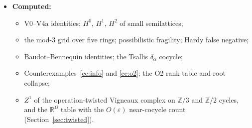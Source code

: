 \documentclass[11pt]{article}
\theoremstyle{definition}
\theoremstyle{remark}
\newcommand{\Z}{\mathbb{Z}}
\newcommand{\R}{\mathbb{R}}
\begin{document}
\begin{itemize}
\begin{itemize}
    \item the band proposition (Proposition~\ref{prop:band}) and twist-invariance for symmetric local solutions (Proposition~\ref{prop:twistinv}); holonomy on the graph stratum with $\R^\Omega$ coefficients (Proposition~\ref{prop:pwgraph}), non-exact under Vigneaux locality; weak-edge contextuality without holonomy (Proposition~\ref{prop:weakedge}); the admissibility criterion (Corollary~\ref{cor:admiss}); two-sided acyclicity (Proposition~\ref{prop:twoside}); single-source consistency (Proposition~\ref{prop:singlesource}); formality of the surprisal (Proposition~\ref{prop:massey}); the $p$-adic gluing radius and sign twist (Proposition~\ref{prop:padicradius}); invisibility of node-wise distortions (Proposition~\ref{prop:nodewise}); filled cells are flat (Proposition~\ref{prop:filled}); naturality of phase changes (Proposition~\ref{prop:natural}); descent (Lemma~\ref{lem:descent}); toggle directions (Proposition~\ref{prop:toggle}); hull invariants of a filled cell and the $p$-adic order profile (Proposition~\ref{prop:hull}); the variogram tree (Proposition~\ref{prop:variogram}); majority reads the tree (Proposition~\ref{prop:majority}); the AMB toggle radius and Markov-move closure of co-facial sets (Proposition~\ref{prop:ambtoggle}); non-identifiability of the root level (Proposition~\ref{prop:root}); decoding as Bayesian inversion (Proposition~\ref{prop:bayesinv}); functoriality of mutual-information persistence (Proposition~\ref{prop:mipers}); region dependence is loop content (Proposition~\ref{prop:regioninv}); the first-order landscape (Proposition~\ref{prop:landscape}).
  \end{itemize}
  \item \textbf{Computed:}
  \begin{itemize}
    \item V0--V4a identities; $H^0$, $H^1$, $H^2$ of small semilattices;
    \item the mod-3 grid over five rings; possibilistic fragility; Hardy false negative;
    \item Baudot--Bennequin identities; the Tsallis $\delta_\alpha$ cocycle;
    \item Counterexamples~\ref{ce:info} and \ref{ce:o2}; the O2 rank table and root collapse;
    \item $Z^1$ of the operation-twisted Vigneaux complex on $\Z/3$ and $\Z/2$ cycles, and the $\R^\Omega$ table with the $O(\varepsilon)$ near-cocycle count (Section~\ref{sec:twisted}).
  \end{itemize}

\end{itemize}
\end{document}
